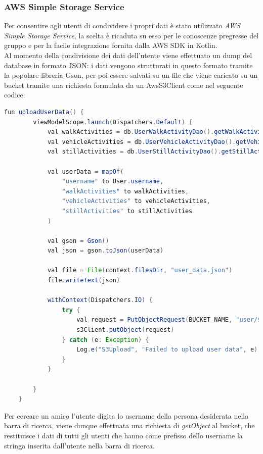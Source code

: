 \documentclass{article}
\begin{document}
\subsubsection*{AWS Simple Storage Service}
Per consentire agli utenti di condividere i propri dati è stato utilizzato \textit{AWS Simple Storage Service}, la scelta è ricaduta su esso per le conoscenze pregresse del gruppo e per la facile integrazione fornita dalla AWS SDK in Kotlin.\\
Al momento della condivisione dei dati dell'utente viene effettuato un dump del database in formato JSON: i dati vengono strutturati in questo formato tramite la popolare libreria Gson, per poi essere salvati su un file che viene caricato su un bucket tramite una richiesta formulata da un AwsS3Client come nel seguente codice:\\
\begin{lstlisting}[language=Java]
    fun uploadUserData() {
        viewModelScope.launch(Dispatchers.Default) {
            val walkActivities = db.UserWalkActivityDao().getWalkActivitiesByUserId(User.id)
            val vehicleActivities = db.UserVehicleActivityDao().getVehicleActivitiesByUserId(User.id)
            val stillActivities = db.UserStillActivityDao().getStillActivitiesByUserId(User.id)

            val userData = mapOf(
                "username" to User.username,
                "walkActivities" to walkActivities,
                "vehicleActivities" to vehicleActivities,
                "stillActivities" to stillActivities
            )

            val gson = Gson()
            val json = gson.toJson(userData)

            val file = File(context.filesDir, "user_data.json")
            file.writeText(json)

            withContext(Dispatchers.IO) {
                try {
                    val request = PutObjectRequest(BUCKET_NAME, "user/${User.username}.json", file)
                    s3Client.putObject(request)
                } catch (e: Exception) {
                    Log.e("S3Upload", "Failed to upload user data", e)
                }
            }

        }
    }

\end{lstlisting}
Per cercare un amico l'utente digita lo username della persona desiderata nella barra di ricerca, viene dunque effettuata una richiesta di \textit{getObject} al bucket, che restituisce i dati di tutti gli utenti che hanno come prefisso dello username la stringa inserita dall'utente nella barra di ricerca.
\end{document}
